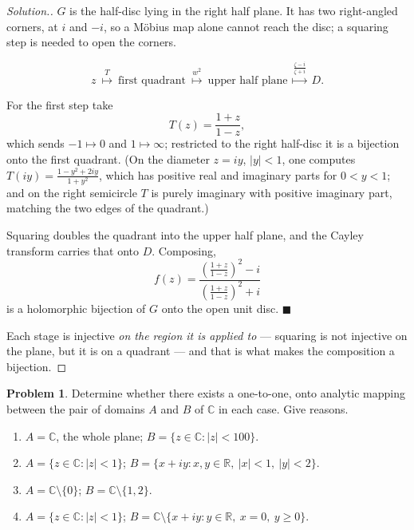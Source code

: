 \documentclass[11pt,a4paper]{article}
\theoremstyle{definition}
\newtheorem{problemx}{Problem}[section]
\newenvironment{problem}{\begin{problemx}}{\end{problemx}}
\newenvironment{solution}
  {\renewcommand{\qedsymbol}{}\begin{proof}[\textit{Solution}.]}
  {\end{proof}}
\begin{document}
\begin{solution}
$G$ is the half-disc lying in the right half plane. It has two right-angled corners,
at $i$ and $-i$, so a M\"obius map alone cannot reach the disc; a squaring step is
needed to open the corners.

$$z \ \overset{T}{\longmapsto}\ \text{first quadrant}
\ \overset{w^{2}}{\longmapsto}\ \text{upper half plane}
\ \overset{\frac{\zeta-i}{\zeta+i}}{\longmapsto}\ D .$$

For the first step take
$$T(z) = \frac{1+z}{1-z},$$
which sends $-1 \mapsto 0$ and $1 \mapsto \infty$; restricted to the right
half-disc it is a bijection onto the first quadrant. (On the diameter
$z = iy$, $\left|y\right|<1$, one computes $T(iy) = \frac{1-y^{2}+2iy}{1+y^{2}}$,
which has positive real and imaginary parts for $0 < y < 1$; and on the right
semicircle $T$ is purely imaginary with positive imaginary part, matching the two
edges of the quadrant.)

Squaring doubles the quadrant into the upper half plane, and the Cayley transform
carries that onto $D$. Composing,
$$\boxed{f(z) = \frac{\left(\frac{1+z}{1-z}\right)^{2} - i}
{\left(\frac{1+z}{1-z}\right)^{2} + i}}$$
is a holomorphic bijection of $G$ onto the open unit disc. $\blacksquare$

Each stage is injective \emph{on the region it is applied to} --- squaring is not
injective on the plane, but it is on a quadrant --- and that is what makes the
composition a bijection.
\end{solution}


\begin{problem}
Determine whether there exists a one-to-one, onto analytic mapping between the
pair of domains $A$ and $B$ of $\mathbb{C}$ in each case. Give reasons.
\begin{enumerate}
\item[(a).] $A = \mathbb{C}$, the whole plane;
$B = \{z \in \mathbb{C} : \left|z\right| < 100\}$.
\item[(b).] $A = \{z \in \mathbb{C} : \left|z\right| < 1\}$;
$B = \{x + iy : x, y \in \mathbb{R},\ \left|x\right| < 1,\ \left|y\right| < 2\}$.
\item[(c).] $A = \mathbb{C}\setminus\{0\}$;
$B = \mathbb{C}\setminus\{1, 2\}$.
\item[(d).] $A = \{z \in \mathbb{C} : \left|z\right| < 1\}$;
$B = \mathbb{C}\setminus\{x + iy : y \in \mathbb{R},\ x = 0,\ y \geq 0\}$.
\end{enumerate}
\end{problem}
\end{document}
